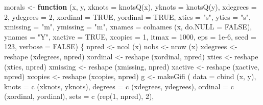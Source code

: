 \documentclass[
  12pt,
]{book}
\newenvironment{Shaded}{\begin{snugshade}}{\end{snugshade}}
\newcommand{\AttributeTok}[1]{\textcolor[rgb]{0.77,0.63,0.00}{#1}}
\newcommand{\ConstantTok}[1]{\textcolor[rgb]{0.00,0.00,0.00}{#1}}
\newcommand{\ControlFlowTok}[1]{\textcolor[rgb]{0.13,0.29,0.53}{\textbf{#1}}}
\newcommand{\DecValTok}[1]{\textcolor[rgb]{0.00,0.00,0.81}{#1}}
\newcommand{\FloatTok}[1]{\textcolor[rgb]{0.00,0.00,0.81}{#1}}
\newcommand{\FunctionTok}[1]{\textcolor[rgb]{0.00,0.00,0.00}{#1}}
\newcommand{\NormalTok}[1]{#1}
\newcommand{\OtherTok}[1]{\textcolor[rgb]{0.56,0.35,0.01}{#1}}
\newcommand{\StringTok}[1]{\textcolor[rgb]{0.31,0.60,0.02}{#1}}
\begin{document}
\begin{Shaded}
\begin{Highlighting}[]
\NormalTok{morals }\OtherTok{\textless{}{-}}
  \ControlFlowTok{function}\NormalTok{ (x,}
\NormalTok{            y,}
            \AttributeTok{xknots =} \FunctionTok{knotsQ}\NormalTok{(x),}
            \AttributeTok{yknots =} \FunctionTok{knotsQ}\NormalTok{(y),}
            \AttributeTok{xdegrees =} \DecValTok{2}\NormalTok{,}
            \AttributeTok{ydegrees =} \DecValTok{2}\NormalTok{,}
            \AttributeTok{xordinal =} \ConstantTok{TRUE}\NormalTok{,}
            \AttributeTok{yordinal =} \ConstantTok{TRUE}\NormalTok{,}
            \AttributeTok{xties =} \StringTok{"s"}\NormalTok{,}
            \AttributeTok{yties =} \StringTok{"s"}\NormalTok{,}
            \AttributeTok{xmissing =} \StringTok{"m"}\NormalTok{,}
            \AttributeTok{ymissing =} \StringTok{"m"}\NormalTok{,}
            \AttributeTok{xnames =} \FunctionTok{colnames}\NormalTok{ (x, }\AttributeTok{do.NULL =} \ConstantTok{FALSE}\NormalTok{),}
            \AttributeTok{ynames =} \StringTok{"Y"}\NormalTok{,}
            \AttributeTok{xactive =} \ConstantTok{TRUE}\NormalTok{,}
            \AttributeTok{xcopies =} \DecValTok{1}\NormalTok{,}
            \AttributeTok{itmax =} \DecValTok{1000}\NormalTok{,}
            \AttributeTok{eps =} \FloatTok{1e{-}6}\NormalTok{,}
            \AttributeTok{seed =} \DecValTok{123}\NormalTok{,}
            \AttributeTok{verbose =} \ConstantTok{FALSE}\NormalTok{) \{}
\NormalTok{    npred }\OtherTok{\textless{}{-}} \FunctionTok{ncol}\NormalTok{ (x)}
\NormalTok{    nobs }\OtherTok{\textless{}{-}} \FunctionTok{nrow}\NormalTok{ (x)}
\NormalTok{    xdegrees }\OtherTok{\textless{}{-}} \FunctionTok{reshape}\NormalTok{ (xdegrees, npred)}
\NormalTok{    xordinal }\OtherTok{\textless{}{-}} \FunctionTok{reshape}\NormalTok{ (xordinal, npred)}
\NormalTok{    xties }\OtherTok{\textless{}{-}} \FunctionTok{reshape}\NormalTok{ (xties, npred)}
\NormalTok{    xmissing }\OtherTok{\textless{}{-}} \FunctionTok{reshape}\NormalTok{ (xmissing, npred)}
\NormalTok{    xactive }\OtherTok{\textless{}{-}} \FunctionTok{reshape}\NormalTok{ (xactive, npred)}
\NormalTok{    xcopies }\OtherTok{\textless{}{-}} \FunctionTok{reshape}\NormalTok{ (xcopies, npred)}
\NormalTok{    g }\OtherTok{\textless{}{-}} \FunctionTok{makeGifi}\NormalTok{ (}
      \AttributeTok{data =} \FunctionTok{cbind}\NormalTok{ (x, y),}
      \AttributeTok{knots =} \FunctionTok{c}\NormalTok{ (xknots, yknots),}
      \AttributeTok{degrees =} \FunctionTok{c}\NormalTok{ (xdegrees, ydegrees),}
      \AttributeTok{ordinal =} \FunctionTok{c}\NormalTok{ (xordinal, yordinal),}
      \AttributeTok{sets =}  \FunctionTok{c}\NormalTok{ (}\FunctionTok{rep}\NormalTok{(}\DecValTok{1}\NormalTok{, npred), }\DecValTok{2}\NormalTok{),}

\end{Highlighting}
\end{Shaded}
\end{document}
